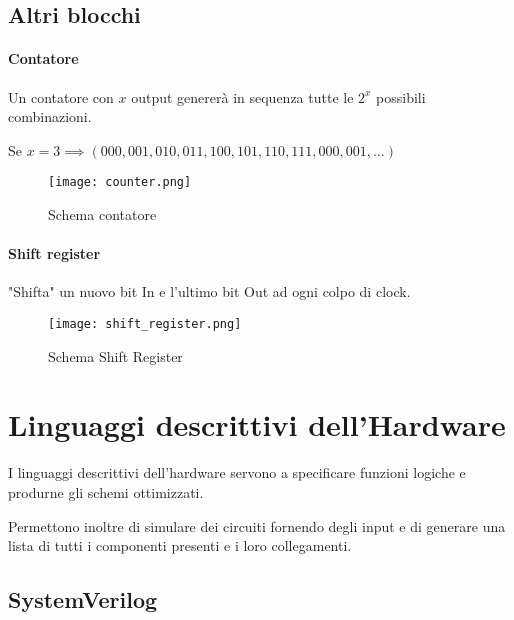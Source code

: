 \documentclass{article}
\begin{document}
\newpage

\subsection{Altri blocchi}

\paragraph{Contatore}

Un contatore con $x$ output genererà in sequenza tutte le $2^x$ possibili combinazioni.

\vspace{3pt}

Se $x=3 \implies  (000,001,010,011,100,101,110,111,000,001,\ldots)$

\begin{figure}[ht]
    \centering
    \texttt{[image: counter.png]}
    \caption{Schema contatore}
    \label{fig:counter}
\end{figure}

\paragraph{Shift register}

"Shifta" un nuovo bit In e l'ultimo bit Out ad ogni colpo di clock.

\begin{figure}[ht]
    \centering
    \texttt{[image: shift\_register.png]}
    \caption{Schema Shift Register}
    \label{fig:shift_register}
\end{figure}

\section{Linguaggi descrittivi dell’Hardware
}

I linguaggi descrittivi dell’hardware servono a specificare funzioni logiche e produrne gli schemi ottimizzati.\newline

Permettono inoltre di simulare dei circuiti fornendo degli input e di generare una lista di tutti i componenti presenti e i loro collegamenti.

\subsection{SystemVerilog}
\end{document}
